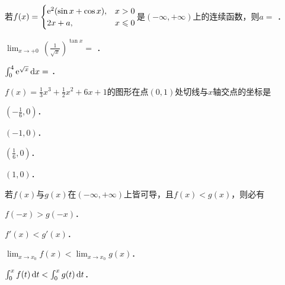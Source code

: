 \documentclass[plain,noanswer,medmath]{../../template/jnuexam}
\begin{document}






\begin{problem}
若$f(x)=\begin{cases}
  \mathrm{e}^2(\sin x+\cos x), & x>0 \\
                 2x+a, & x\leqslant 0
\end{cases}$是$(-\infty,+\infty)$上的连续函数，则$a=$ \fillin{}．
\end{problem}






\begin{problem}
$\lim_{x\to +0}\,\left(\frac{1}{\sqrt{x}} \right)^{\tan x}=$ \fillin{}．
\end{problem}


\begin{problem}
$\int_0^4\mathrm{e}^{\sqrt{x}} \mathop{}\!\mathrm{d} x=$ \fillin{}．
\end{problem}




\begin{problem}
$f(x)=\frac{1}{3}x^3+\frac{1}{2}x^2+6x+1$的图形在点$\left(0,1 \right)$处切线与$x$轴交点的坐标是\pickout{}
\begin{abcd}
\item $\left(-\frac{1}{6},0\right)$．         
\item $\left(-1,0\right)$．      
\item $\left(\frac{1}{6},0\right)$．      
\item $\left(1,0\right)$．
\end{abcd}
\end{problem}


\begin{problem}
若$f(x)$与$g(x)$在$(-\infty,+\infty)$上皆可导，且$f(x)<g(x)$，则必有\pickout{}
\begin{abcd}
\item $f(-x)>g(-x)$．
\item $f'(x)<g'(x)$．
\item $\lim_{x\to x_0}f(x)<\lim_{x\to x_0}g(x)$．
\item $\int_0^x f(t)\mathop{}\!\mathrm{d} t<\int_0^x g(t)\mathop{}\!\mathrm{d} t$．
\end{abcd}
\end{problem}
\end{document}
